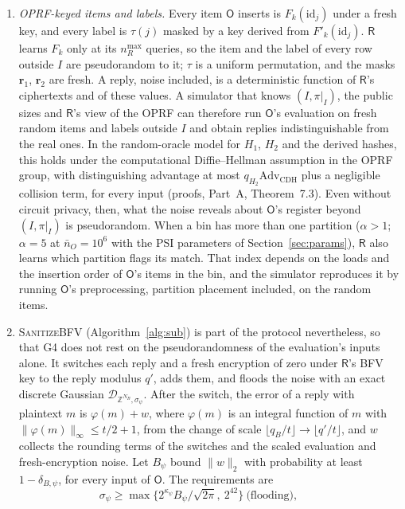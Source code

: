 \documentclass[11pt]{article}
\theoremstyle{definition}
\theoremstyle{plain}
\newcommand{\Z}{\mathbb{Z}}
\newcommand{\Party}[1]{\textsf{#1}}
\newcommand{\Rp}{\Party{R}}
\newcommand{\Op}{\Party{O}}
\begin{document}
\begin{enumerate}[noitemsep, label=(\alph*)]
  \item \emph{OPRF-keyed items and labels.} Every item $\Op$ inserts is $F_k(\mathrm{id}_j)$ under a fresh key, and every label is $\tau(j)$ masked by a key derived from $F'_k(\mathrm{id}_j)$. $\Rp$ learns $F_k$ only at its $n_R^{\max}$ queries, so the item and the label of every row outside $I$ are pseudorandom to it; $\tau$ is a uniform permutation, and the masks $\mathbf r_1$, $\mathbf r_2$ are fresh. A reply, noise included, is a deterministic function of $\Rp$'s ciphertexts and of these values. A simulator that knows $(I, \pi|_I)$, the public sizes and $\Rp$'s view of the OPRF can therefore run $\Op$'s evaluation on fresh random items and labels outside $I$ and obtain replies indistinguishable from the real ones. In the random-oracle model for $H_1$, $H_2$ and the derived hashes, this holds under the computational Diffie--Hellman assumption in the OPRF group, with distinguishing advantage at most $q_{H_2}\mathrm{Adv}_{\mathrm{CDH}}$ plus a negligible collision term, for every input (proofs, Part~A, Theorem~7.3). Even without circuit privacy, then, what the noise reveals about $\Op$'s register beyond $(I, \pi|_I)$ is pseudorandom. When a bin has more than one partition ($\alpha > 1$; $\alpha = 5$ at $\bar n_O = 10^6$ with the PSI parameters of Section~\ref{sec:params}), $\Rp$ also learns which partition flags its match. That index depends on the loads and the insertion order of $\Op$'s items in the bin, and the simulator reproduces it by running $\Op$'s preprocessing, partition placement included, on the random items.
  \item \textsc{SanitizeBFV} (Algorithm~\ref{alg:sub}) is part of the protocol nevertheless, so that G4 does not rest on the pseudorandomness of the evaluation's inputs alone. It switches each reply and a fresh encryption of zero under $\Rp$'s BFV key to the reply modulus $q'$, adds them, and floods the noise with an exact discrete Gaussian $\mathcal D_{\Z^{N_B}, \sigma_\psi}$. After the switch, the error of a reply with plaintext $m$ is $\varphi(m) + w$, where $\varphi(m)$ is an integral function of $m$ with $\|\varphi(m)\|_\infty \le t/2 + 1$, from the change of scale $\lfloor q_B/t \rfloor \to \lfloor q'/t \rfloor$, and $w$ collects the rounding terms of the switches and the scaled evaluation and fresh-encryption noise. Let $B_\psi$ bound $\|w\|_2$ with probability at least $1 - \delta_{B,\psi}$, for every input of $\Op$. The requirements are
  \[
    \sigma_\psi \ge \max\{2^{\kappa_\psi}B_\psi/\sqrt{2\pi},\ 2^{42}\} \ \text{(flooding)}, \qquad
\]
\end{enumerate}
\end{document}
